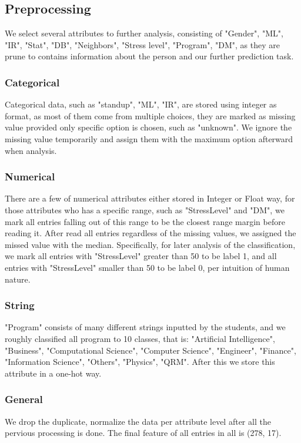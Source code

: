 \documentclass[runningheads]{llncs}
\begin{document}
\subsection{Preprocessing}
\label{sec:prep}

We select several attributes to further analysis, consisting of "Gender", "ML", "IR", "Stat", "DB", "Neighbors", "Stress level", "Program", "DM", as they are prune to contains information about the person and our further prediction task.

\subsubsection{Categorical}
Categorical data, such as "standup", "ML", "IR", are stored using integer as format, as most of them come from multiple choices, they are marked as missing value provided only specific option is chosen, such as "unknown". We ignore the missing value temporarily and assign them with the maximum option afterward when analysis.
\subsubsection{Numerical}
There are a few of numerical attributes either stored in Integer or Float way, for those attributes who has a specific range, such as "StressLevel" and "DM", we mark all entries falling out of this range to be the closest range margin before reading it. After read all entries regardless of the missing values, we assigned the missed value with the median. Specifically, for later analysis of the classification, we mark all entries with "StressLevel" greater than 50 to be label 1, and all entries with "StressLevel" smaller than 50 to be label 0, per intuition of human nature.
\subsubsection{String}
"Program" consists of many different strings inputted by the students, and we roughly classified all program to 10 classes, that is: "Artificial Intelligence", "Business", "Computational Science", "Computer Science", "Engineer", "Finance", "Information Science", "Others", "Physics", "QRM". After this we store this attribute in a one-hot way.

\subsubsection{General}
We drop the duplicate, normalize the data per attribute level after all the pervious processing is done. The final feature of all entries in all is (278, 17).
\end{document}
